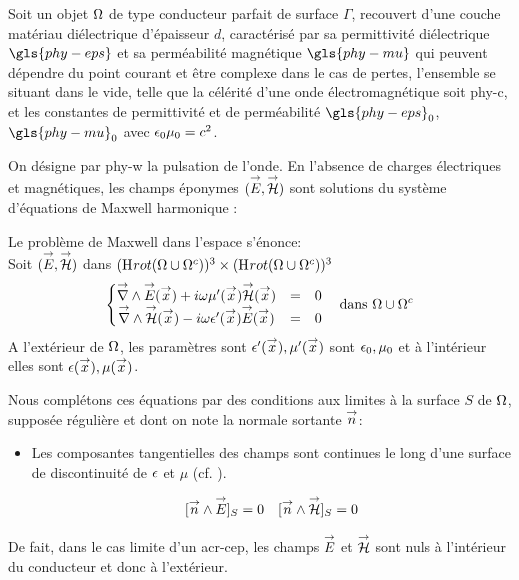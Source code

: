 Soit un objet \(\Omega\) de type conducteur parfait de surface \(\Gamma\), recouvert d'une couche matériau diélectrique d'épaisseur \(d\), caractérisé par sa permittivité diélectrique \(\gls{phy-eps}\) et sa perméabilité magnétique \(\gls{phy-mu}\) qui peuvent dépendre du point courant et être complexe dans le cas de pertes, l'ensemble se situant dans le vide, telle que la célérité d'une onde électromagnétique soit \gls{phy-c}, et les constantes de permittivité et de perméabilité \(\gls{phy-eps}_0\), \(\gls{phy-mu}_0\) avec \(\epsilon_0\mu_0 = c^{2}\).


On désigne par \gls{phy-w} la pulsation de l'onde.
En l'absence de charges électriques et magnétiques, les champs éponymes \(( {\overset{\rightarrow}{E}}, {\overset{\rightarrow}{\mathcal{H}}} )\) sont solutions du système d'équations de Maxwell harmonique :

Le problème de Maxwell dans l'espace s'énonce: \\

Soit \(({\overset{\rightarrow}{E}},{\overset{\rightarrow}{\mathcal{H}}})\) dans \((\mathrm{H}_\mathrm{{}}{rot}(\Omega\cup\Omega^c))^3 \times (\mathrm{H}_\mathrm{{}}{rot}(\Omega\cup\Omega^c))^3\)
\begin{equation}
\label{eq:pres_th:intro:maxwell}
\left\lbrace \begin{matrix}
{\overset{\rightarrow}{\nabla}}\wedge {\overset{\rightarrow}{E}}({\overset{\rightarrow}{x}}) + i\omega\mu'({\overset{\rightarrow}{x}}) {\overset{\rightarrow}{\mathcal{H}}}({\overset{\rightarrow}{x}}) &=& 0 \\
{\overset{\rightarrow}{\nabla}}\wedge {\overset{\rightarrow}{\mathcal{H}}}({\overset{\rightarrow}{x}}) - i\omega\epsilon'({\overset{\rightarrow}{x}}) {\overset{\rightarrow}{E}}({\overset{\rightarrow}{x}}) &=& 0 \\
\end{matrix} \right.
\quad \text{dans \(\Omega\cup\Omega^c\)}
\end{equation}
A l'extérieur de \(\Omega\), les paramètres sont \(\epsilon'({\overset{\rightarrow}{x}}),\mu'({\overset{\rightarrow}{x}})\) sont \(\epsilon_0,\mu_0\) et à l'intérieur elles sont \(\epsilon({\overset{\rightarrow}{x}}),\mu({\overset{\rightarrow}{x}})\).


Nous complétons ces équations par des conditions aux limites à la surface \(S\) de \(\Omega\), supposée régulière et dont on note la normale sortante \({\overset{\rightarrow}{n}}\):
\begin{itemize}
  \item Les composantes tangentielles des champs sont continues le long d'une surface de discontinuité de \(\epsilon\) et \(\mu\) (cf. \cite[(2.10) p.~8]{senior_approximate_1995}).

  \begin{align}
  \label{eq:pres_th:intro:transmissions}[{\overset{\rightarrow}{n}} \wedge {\overset{\rightarrow}{E}}]_S = 0  \quad [{\overset{\rightarrow}{n}} \wedge {\overset{\rightarrow}{\mathcal{H}}}]_S = 0
  \end{align}
\end{itemize}
De fait, dans le cas limite d'un \gls{acr-cep}, les champs \({\overset{\rightarrow}{E}}\) et \({\overset{\rightarrow}{\mathcal{H}}}\) sont nuls à l'intérieur du conducteur et donc à l'extérieur.


